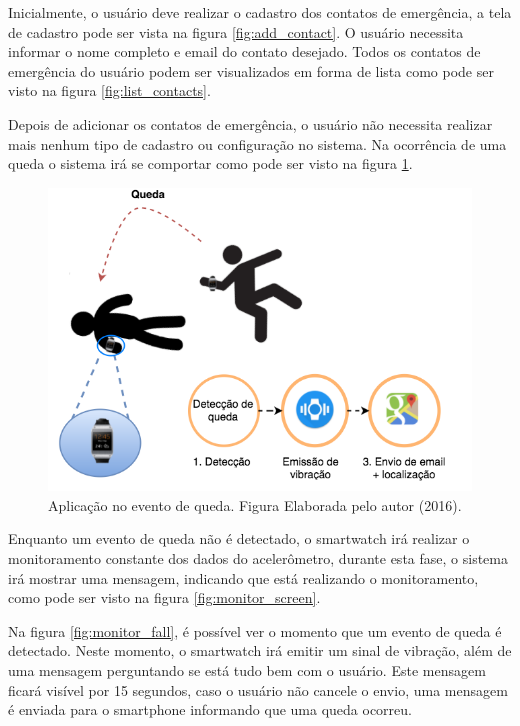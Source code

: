 Inicialmente, o usuário deve realizar o cadastro dos contatos de emergência, a tela de cadastro pode ser vista na figura \ref{fig:add_contact}. O usuário necessita informar o nome completo e email do contato desejado. Todos os contatos de emergência do usuário podem ser visualizados em forma de lista como pode ser visto na figura \ref{fig:list_contacts}.


Depois de adicionar os contatos de emergência, o usuário não necessita realizar mais nenhum tipo de cadastro ou configuração no sistema. Na ocorrência de uma queda o sistema irá se comportar como pode ser visto na figura \ref{fig:diagram}.


\begin{figure}[ht]
	\centering
	\includegraphics[scale=0.6]{imagens/DiagramaQueda.png}
	\caption{Aplicação no evento de queda. Figura Elaborada pelo autor (2016).}
	\label{fig:diagram}
\end{figure}

Enquanto um evento de queda não é detectado, o smartwatch irá realizar o monitoramento constante dos dados do acelerômetro, durante esta fase, o sistema irá mostrar uma mensagem, indicando que está realizando o monitoramento, como pode ser visto na figura \ref{fig:monitor_screen}. 


Na figura \ref{fig:monitor_fall}, é possível ver o momento que um evento de queda é detectado. Neste momento, o smartwatch irá emitir um sinal de vibração, além de uma mensagem perguntando se está tudo bem com o usuário. Este mensagem ficará visível por 15 segundos, caso o usuário não cancele o envio, uma mensagem é enviada para o smartphone informando que uma queda ocorreu.


